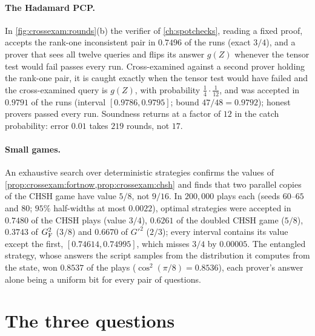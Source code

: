 \begin{refsection}
\paragraph{The Hadamard PCP.} In \cref{fig:crossexam:rounds}(b) the verifier of \cref{ch:spotchecks}, reading a fixed proof, accepts the rank-one inconsistent pair in $0.7496$ of the runs (exact $3/4$), and a prover that sees all twelve queries and flips its answer $g(Z)$ whenever the tensor test would fail passes every run. Cross-examined against a second prover holding the rank-one pair, it is caught exactly when the tensor test would have failed and the cross-examined query is $g(Z)$, with probability $\frac14\cdot\frac1{12}$, and was accepted in $0.9791$ of the runs (interval $[0.9786,0.9795]$; bound $47/48=0.9792$); honest provers passed every run. Soundness returns at a factor of $12$ in the catch probability: error $0.01$ takes $219$ rounds, not $17$.


\paragraph{Small games.} An exhaustive search over deterministic strategies confirms the values of \cref{prop:crossexam:fortnow,prop:crossexam:chsh} and finds that two parallel copies of the CHSH game have value $5/8$, not $9/16$. In $200{,}000$ plays each (seeds $60$--$65$ and $80$; $95\%$ half-widths at most $0.0022$), optimal strategies were accepted in $0.7480$ of the CHSH plays (value $3/4$), $0.6261$ of the doubled CHSH game ($5/8$), $0.3743$ of $G_{\mathrm{F}}^2$ ($3/8$) and $0.6670$ of $G'^2$ ($2/3$); every interval contains its value except the first, $[0.74614,0.74995]$, which misses $3/4$ by $0.00005$. The entangled strategy, whose answers the script samples from the distribution it computes from the state, won $0.8537$ of the plays ($\cos^2(\pi/8)=0.8536$), each prover's answer alone being a uniform bit for every pair of questions.

\section{The three questions}\label{sec:crossexam:questions}


\end{refsection}
